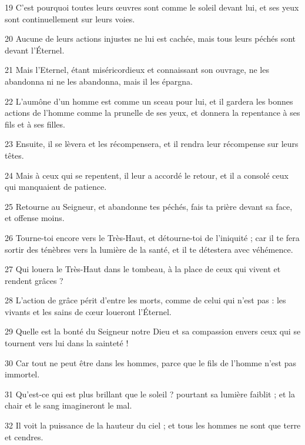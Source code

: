 \par 19 C'est pourquoi toutes leurs œuvres sont comme le soleil devant lui, et ses yeux sont continuellement sur leurs voies.
\par 20 Aucune de leurs actions injustes ne lui est cachée, mais tous leurs péchés sont devant l'Éternel.
\par 21 Mais l'Eternel, étant miséricordieux et connaissant son ouvrage, ne les abandonna ni ne les abandonna, mais il les épargna.
\par 22 L'aumône d'un homme est comme un sceau pour lui, et il gardera les bonnes actions de l'homme comme la prunelle de ses yeux, et donnera la repentance à ses fils et à ses filles.
\par 23 Ensuite, il se lèvera et les récompensera, et il rendra leur récompense sur leurs têtes.
\par 24 Mais à ceux qui se repentent, il leur a accordé le retour, et il a consolé ceux qui manquaient de patience.
\par 25 Retourne au Seigneur, et abandonne tes péchés, fais ta prière devant sa face, et offense moins.
\par 26 Tourne-toi encore vers le Très-Haut, et détourne-toi de l'iniquité ; car il te fera sortir des ténèbres vers la lumière de la santé, et il te détestera avec véhémence.
\par 27 Qui louera le Très-Haut dans le tombeau, à la place de ceux qui vivent et rendent grâces ?
\par 28 L'action de grâce périt d'entre les morts, comme de celui qui n'est pas : les vivants et les sains de cœur loueront l'Éternel.
\par 29 Quelle est la bonté du Seigneur notre Dieu et sa compassion envers ceux qui se tournent vers lui dans la sainteté !
\par 30 Car tout ne peut être dans les hommes, parce que le fils de l'homme n'est pas immortel.
\par 31 Qu'est-ce qui est plus brillant que le soleil ? pourtant sa lumière faiblit ; et la chair et le sang imagineront le mal.
\par 32 Il voit la puissance de la hauteur du ciel ; et tous les hommes ne sont que terre et cendres.


